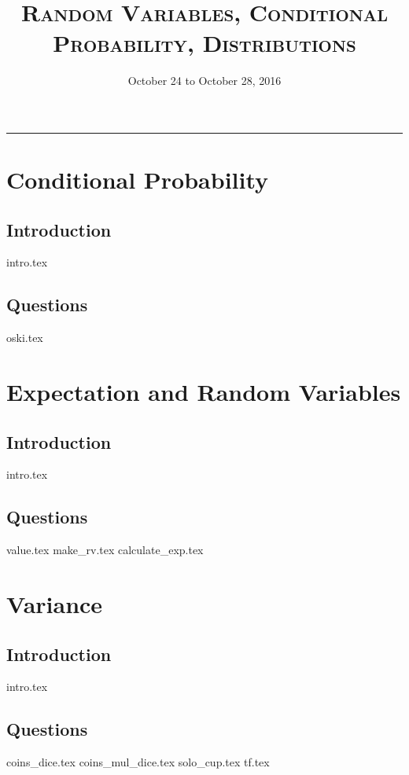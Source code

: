 \documentclass{exam}
\title{\textsc{Random Variables, Conditional Probability, Distributions}}
\date{October 24 to October 28, 2016}
\begin{document}
\maketitle
\rule{\textwidth}{0.15em}
\fontsize{12}{15}\selectfont
\thispagestyle{empty}

\section{Conditional Probability}
\subsection{Introduction}
{intro.tex}
\clearpage
\subsection{Questions}
\begin{questions}
{oski.tex}
\end{questions}

\section{Expectation and Random Variables}
\subsection{Introduction}
{intro.tex}
\subsection{Questions}
\begin{questions}
{value.tex}
{make_rv.tex}
{calculate_exp.tex}
\end{questions}

\section{Variance}
\subsection{Introduction}
{intro.tex}
\subsection{Questions}
\begin{questions}
{coins_dice.tex}
{coins_mul_dice.tex}
{solo_cup.tex}
{tf.tex}
\end{questions}
\end{document}
